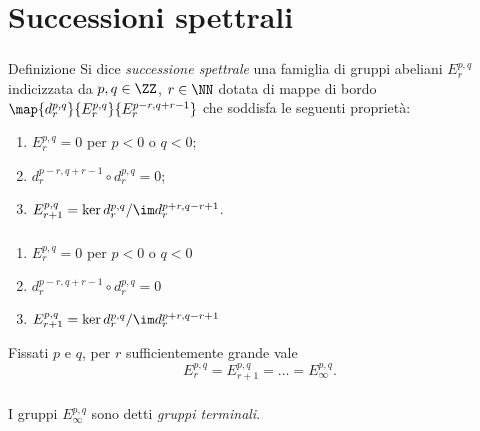 \section{Successioni spettrali}
\newcommand*{\sseqOne}{\(E^{p,q}_r=0\) per \(p<0\) o \(q<0\)}
\newcommand*{\sseqTwo}{\(d^{p-r,q+r-1}_r\circ d^{p,q}_r=0\)}
\newcommand*{\sseqThree}{\(E^{p,q}_{r+1}=\ker d^{p,q}_r/\im d^{p+r,q-r+1}_r\)}
\begin{frame}
\frametitle{\secname}
\begin{block}{Definizione}
Si dice \emph{successione spettrale} una famiglia di gruppi abeliani \(E^{p,q}_r\) indicizzata da \(p,q\in\ZZ\), \(r\in\NN\) dotata di mappe di bordo \(\map{d^{p,q}_r}{E^{p,q}_r}{E^{p-r,q+r-1}_r}\) che soddisfa le seguenti proprietà:
\begin{enumerate}
\item \sseqOne;
\item \sseqTwo;
\item \sseqThree.
\end{enumerate}
\end{block}
\end{frame}
\begin{frame}
\frametitle{\secname}
\begin{overprint}
\begin{enumerate}
\item \sseqOne\vphantom{\sseqTwo}
\end{enumerate}
\begin{enumerate}
\setcounter{enumi}{1}
\item \sseqTwo
\end{enumerate}
\begin{enumerate}
\setcounter{enumi}{2}
\item \sseqThree
\end{enumerate}
Fissati \(p\) e \(q\), per \(r\) sufficientemente grande vale
\vspace{-10pt}
\[
E^{p,q}_r=E^{p,q}_{r+1}=\ldots=E^{p,q}_\infty.
\]
\end{overprint}
\vfill
\begin{overprint}
\centering{}
\centering{}
\centering{}
\centering{}
\end{overprint}
\end{frame}
\begin{frame}
\frametitle{\secname}
I gruppi $E^{p,q}_\infty$ sono detti \emph{gruppi terminali}.
\vspace{0.5cm}
\end{frame}
